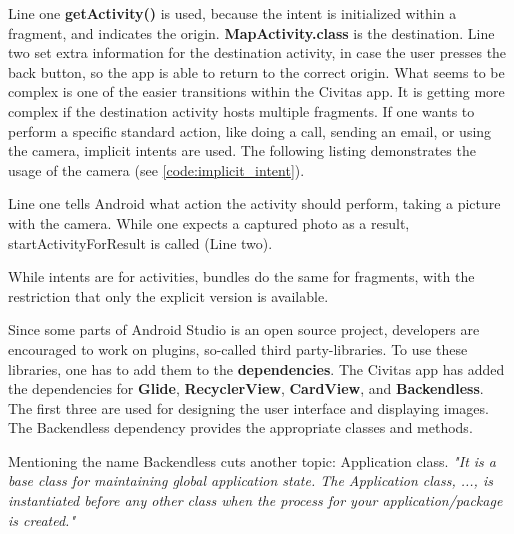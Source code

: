 \begin{mdframed}

\end{mdframed}

Line one \textbf{getActivity()} is used, because the intent is initialized within a fragment, and indicates the origin. \textbf{MapActivity.class} is the destination. Line two set extra information for the destination activity, in case the user presses the back button, so the app is able to return to the correct origin. What seems to be complex is one of the easier transitions within the Civitas app. It is getting more complex if the destination activity hosts multiple fragments.
If one wants to perform a specific standard action, like doing a call, sending an email, or using the camera, implicit intents are used. The following listing demonstrates the usage of the camera (see \ref{code:implicit_intent}).

\begin{mdframed}

\end{mdframed}

Line one tells Android what action the activity should perform, taking a picture with the camera. While one expects a captured photo as a result, startActivityForResult is called (Line two).

While intents are for activities, bundles do the same for fragments, with the restriction that only the explicit version is available.

Since some parts of Android Studio is an open source project, developers are encouraged to work on plugins, so-called third party-libraries. To use these libraries, one has to add them to the \textbf{dependencies}. The Civitas app has added the dependencies for \textbf{Glide}, \textbf{RecyclerView}, \textbf{CardView}, and \textbf{Backendless}. The first three are used for designing the user interface and displaying images. The Backendless dependency provides the appropriate classes and methods.

Mentioning the name Backendless cuts another topic: Application class. \textit{"It is a base class for maintaining global application state. The Application class, ..., is instantiated before any other class when the process for your application/package is created."} \cite{applicationClass}
 
